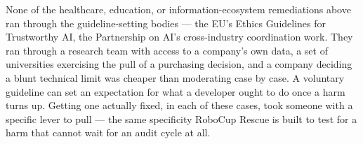 None of the healthcare, education, or information-ecosystem remediations above ran through the guideline-setting bodies — the EU's Ethics Guidelines for Trustworthy AI, the Partnership on AI's cross-industry coordination work. They ran through a research team with access to a company's own data, a set of universities exercising the pull of a purchasing decision, and a company deciding a blunt technical limit was cheaper than moderating case by case. A voluntary guideline can set an expectation for what a developer ought to do once a harm turns up. Getting one actually fixed, in each of these cases, took someone with a specific lever to pull — the same specificity RoboCup Rescue is built to test for a harm that cannot wait for an audit cycle at all.
